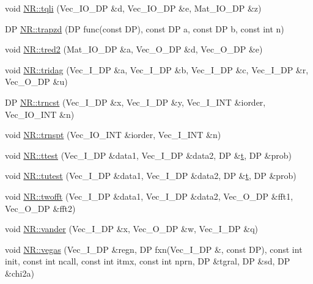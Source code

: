 \begin{DoxyCompactItemize}
\item 
void \mbox{\hyperlink{namespaceNR_a569384a7d408b566462b85edbb04b7f7}{N\+R\+::tqli}} (Vec\+\_\+\+I\+O\+\_\+\+DP \&d, Vec\+\_\+\+I\+O\+\_\+\+DP \&e, Mat\+\_\+\+I\+O\+\_\+\+DP \&z)
\item 
DP \mbox{\hyperlink{namespaceNR_a8bf97a9fcc7bc9cebca3838cde195acb}{N\+R\+::trapzd}} (DP func(const DP), const DP a, const DP b, const int n)
\item 
void \mbox{\hyperlink{namespaceNR_a65685f36fb5e22017a14636bf55b9de0}{N\+R\+::tred2}} (Mat\+\_\+\+I\+O\+\_\+\+DP \&a, Vec\+\_\+\+O\+\_\+\+DP \&d, Vec\+\_\+\+O\+\_\+\+DP \&e)
\item 
void \mbox{\hyperlink{namespaceNR_a217a03f117a9bed3da0ab37c417e8dae}{N\+R\+::tridag}} (Vec\+\_\+\+I\+\_\+\+DP \&a, Vec\+\_\+\+I\+\_\+\+DP \&b, Vec\+\_\+\+I\+\_\+\+DP \&c, Vec\+\_\+\+I\+\_\+\+DP \&r, Vec\+\_\+\+O\+\_\+\+DP \&u)
\item 
DP \mbox{\hyperlink{namespaceNR_a8aa63035f06199a55106f0e6d1fa9e3f}{N\+R\+::trncst}} (Vec\+\_\+\+I\+\_\+\+DP \&x, Vec\+\_\+\+I\+\_\+\+DP \&y, Vec\+\_\+\+I\+\_\+\+I\+NT \&iorder, Vec\+\_\+\+I\+O\+\_\+\+I\+NT \&n)
\item 
void \mbox{\hyperlink{namespaceNR_a36458f311bde4056fc362001e22b2570}{N\+R\+::trnspt}} (Vec\+\_\+\+I\+O\+\_\+\+I\+NT \&iorder, Vec\+\_\+\+I\+\_\+\+I\+NT \&n)
\item 
void \mbox{\hyperlink{namespaceNR_a586892538d6d03cea04d8c3fe1c6bb24}{N\+R\+::ttest}} (Vec\+\_\+\+I\+\_\+\+DP \&data1, Vec\+\_\+\+I\+\_\+\+DP \&data2, DP \&\mbox{\hyperlink{adat__devel_2lib_2hadron_2hadron__timeslice_8cc_ac310d9181e916ba43604099aee272c71}{t}}, DP \&prob)
\item 
void \mbox{\hyperlink{namespaceNR_abd90c424ce9176090408d69f51affa4f}{N\+R\+::tutest}} (Vec\+\_\+\+I\+\_\+\+DP \&data1, Vec\+\_\+\+I\+\_\+\+DP \&data2, DP \&\mbox{\hyperlink{adat__devel_2lib_2hadron_2hadron__timeslice_8cc_ac310d9181e916ba43604099aee272c71}{t}}, DP \&prob)
\item 
void \mbox{\hyperlink{namespaceNR_aee6d9d1d627803bba537f37efaa5e68b}{N\+R\+::twofft}} (Vec\+\_\+\+I\+\_\+\+DP \&data1, Vec\+\_\+\+I\+\_\+\+DP \&data2, Vec\+\_\+\+O\+\_\+\+DP \&fft1, Vec\+\_\+\+O\+\_\+\+DP \&fft2)
\item 
void \mbox{\hyperlink{namespaceNR_acd42c7b9c5541ac69c6fd5728e560c7f}{N\+R\+::vander}} (Vec\+\_\+\+I\+\_\+\+DP \&x, Vec\+\_\+\+O\+\_\+\+DP \&w, Vec\+\_\+\+I\+\_\+\+DP \&q)
\item 
void \mbox{\hyperlink{namespaceNR_a95a3ea0afc3cb560bd8cd72cc112840c}{N\+R\+::vegas}} (Vec\+\_\+\+I\+\_\+\+DP \&regn, DP fxn(Vec\+\_\+\+I\+\_\+\+DP \&, const DP), const int init, const int ncall, const int itmx, const int nprn, DP \&tgral, DP \&sd, DP \&chi2a)

\end{DoxyCompactItemize}
